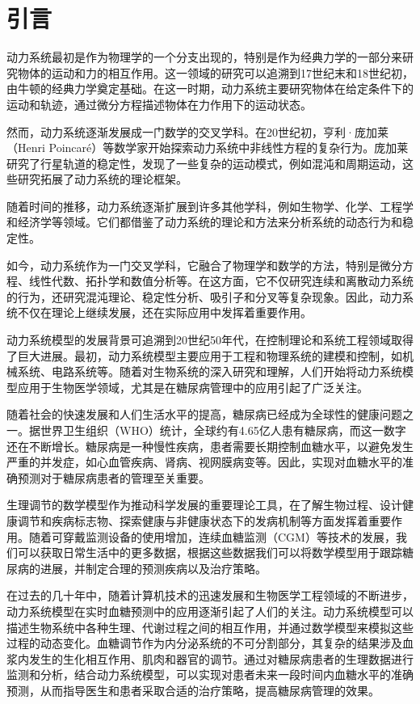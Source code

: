 \chapter{引言}\label{chap:introduction}
动力系统最初是作为物理学的一个分支出现的，特别是作为经典力学的一部分来研究物体的运动和力的相互作用。这一领域的研究可以追溯到17世纪末和18世纪初，由牛顿的经典力学奠定基础。在这一时期，动力系统主要研究物体在给定条件下的运动和轨迹，通过微分方程描述物体在力作用下的运动状态。

然而，动力系统逐渐发展成一门数学的交叉学科。在20世纪初，亨利·庞加莱（Henri Poincaré）等数学家开始探索动力系统中非线性方程的复杂行为。庞加莱研究了行星轨道的稳定性，发现了一些复杂的运动模式，例如混沌和周期运动，这些研究拓展了动力系统的理论框架。

随着时间的推移，动力系统逐渐扩展到许多其他学科，例如生物学、化学、工程学和经济学等领域。它们都借鉴了动力系统的理论和方法来分析系统的动态行为和稳定性。

如今，动力系统作为一门交叉学科，它融合了物理学和数学的方法，特别是微分方程、线性代数、拓扑学和数值分析等。在这方面，它不仅研究连续和离散动力系统的行为，还研究混沌理论、稳定性分析、吸引子和分叉等复杂现象。因此，动力系统不仅在理论上继续发展，还在实际应用中发挥着重要作用。

动力系统模型的发展背景可追溯到20世纪50年代，在控制理论和系统工程领域取得了巨大进展。最初，动力系统模型主要应用于工程和物理系统的建模和控制，如机械系统、电路系统等\cite{hargrove1998dynamic}。随着对生物系统的深入研究和理解，人们开始将动力系统模型应用于生物医学领域，尤其是在糖尿病管理中的应用引起了广泛关注\cite{ellner2006dynamic}。

随着社会的快速发展和人们生活水平的提高，糖尿病已经成为全球性的健康问题之一。据世界卫生组织（WHO）统计，全球约有4.65亿人患有糖尿病，而这一数字还在不断增长\cite{zimmet2016diabetes}。糖尿病是一种慢性疾病，患者需要长期控制血糖水平，以避免发生严重的并发症，如心血管疾病、肾病、视网膜病变等\cite{zheng2018global}。因此，实现对血糖水平的准确预测对于糖尿病患者的管理至关重要。

生理调节的数学模型作为推动科学发展的重要理论工具，在了解生物过程、设计健康调节和疾病标志物、探索健康与非健康状态下的发病机制等方面发挥着重要作用\cite{bakhti2019modelling}。随着可穿戴监测设备的使用增加\cite{kim2020wearable}，连续血糖监测（CGM）等技术的发展，我们可以获取日常生活中的更多数据，根据这些数据我们可以将数学模型用于跟踪糖尿病的进展\cite{ha2020type}，并制定合理的预测疾病以及治疗策略。

在过去的几十年中，随着计算机技术的迅速发展和生物医学工程领域的不断进步，动力系统模型在实时血糖预测中的应用逐渐引起了人们的关注。动力系统模型可以描述生物系统中各种生理、代谢过程之间的相互作用，并通过数学模型来模拟这些过程的动态变化\cite{cobelli2009diabetes}。血糖调节作为内分泌系统的不可分割部分，其复杂的结果涉及血浆内发生的生化相互作用、肌肉和器官的调节\cite{zavala2019mathematical}。通过对糖尿病患者的生理数据进行监测和分析，结合动力系统模型，可以实现对患者未来一段时间内血糖水平的准确预测，从而指导医生和患者采取合适的治疗策略，提高糖尿病管理的效果。

